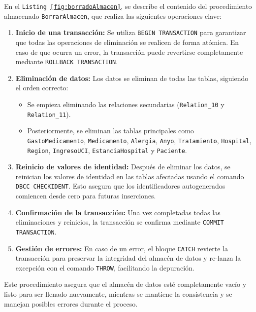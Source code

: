\documentclass{article}
\begin{document}
En el \texttt{Listing \ref{fig:borradoAlmacen}}, se describe el contenido del procedimiento almacenado \texttt{BorrarAlmacen}, que realiza las siguientes operaciones clave:

\begin{enumerate}
	\item \textbf{Inicio de una transacción:} Se utiliza \texttt{BEGIN TRANSACTION} para garantizar que todas las operaciones de eliminación se realicen de forma atómica. En caso de que ocurra un error, la transacción puede revertirse completamente mediante \texttt{ROLLBACK TRANSACTION}.
	
	\item \textbf{Eliminación de datos:} Los datos se eliminan de todas las tablas, siguiendo el orden correcto:
	\begin{itemize}
		\item Se empieza eliminando las relaciones secundarias (\texttt{Relation\_10} y \texttt{Relation\_11}).
		\item Posteriormente, se eliminan las tablas principales como \texttt{GastoMedicamento}, \texttt{Medicamento}, \texttt{Alergia}, \texttt{Anyo}, \texttt{Tratamiento}, \texttt{Hospital}, \texttt{Region}, \texttt{IngresoUCI}, \texttt{EstanciaHospital} y \texttt{Paciente}.
	\end{itemize}
	
	\item \textbf{Reinicio de valores de identidad:} Después de eliminar los datos, se reinician los valores de identidad en las tablas afectadas usando el comando \texttt{DBCC CHECKIDENT}. Esto asegura que los identificadores autogenerados comiencen desde cero para futuras inserciones.
	
	\item \textbf{Confirmación de la transacción:} Una vez completadas todas las eliminaciones y reinicios, la transacción se confirma mediante \texttt{COMMIT TRANSACTION}.
	
	\item \textbf{Gestión de errores:} En caso de un error, el bloque \texttt{CATCH} revierte la transacción para preservar la integridad del almacén de datos y re-lanza la excepción con el comando \texttt{THROW}, facilitando la depuración.
\end{enumerate}

Este procedimiento asegura que el almacén de datos esté completamente vacío y listo para ser llenado nuevamente, mientras se mantiene la consistencia y se manejan posibles errores durante el proceso.
\end{document}
